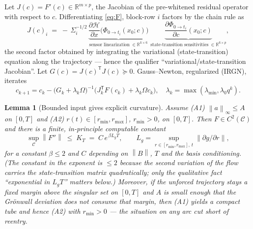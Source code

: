 \documentclass[11pt]{article}
\theoremstyle{plain}
\newtheorem{lemma}[theorem]{Lemma}
\theoremstyle{definition}
\theoremstyle{remark}
\newcommand{\R}{\mathbb{R}}
\newcommand{\norm}[1]{\left\lVert#1\right\rVert}
\newcommand{\trc}{\mathsf{T}}
\begin{document}
Let $J(c)=F'(c)\in\R^{m\times p}$, the Jacobian of the pre-whitened
residual operator with respect to $c$. Differentiating
\eqref{eq:F}, block-row $i$ factors by the chain rule as
\begin{equation}
J(c)_i \;=\; -\,\Sigma_i^{-1/2}\,
\underbrace{\frac{\partial \mathcal H}{\partial x}\big(\Phi_{0\to t_i}(x_0;c)\big)}_{\text{sensor linearization}\;\in\R^{k\times 6}}\;
\underbrace{\frac{\partial \Phi_{0\to t_i}}{\partial c}(x_0;c)}_{\text{state-transition sensitivities}\;\in\R^{6\times p}},
\label{eq:Jfactor}
\end{equation}
the second factor obtained by integrating the variational
(state-transition) equation along the trajectory --- hence the
qualifier ``variational/state-transition Jacobian''. Let
$G(c)=J(c)^{\trc}J(c)\succeq0$. Gauss--Newton, regularized
(IRGN), iterates
\begin{equation}
c_{k+1}=c_k-\big(G_k+\lambda_k\Omega\big)^{-1}
\big(J_k^{\trc}F(c_k)+\lambda_k\Omega c_k\big),\quad
\lambda_k=\max(\lambda_{\min},\lambda_0 q^{k}).
\label{eq:irgn}
\end{equation}

\begin{lemma}[Bounded input gives explicit curvature]\label{lem:KT}
Assume \textup{(A1)} $\norm{a}_\infty\le A$ on $[0,T]$ and \textup{(A2)}
$r(t)\in[r_{\min},r_{\max}]$, $r_{\min}>0$, on $[0,T]$. Then $F\in
C^{2}(\mathcal C)$ and there is a finite, in-principle computable constant
\begin{equation}
\sup_{\mathcal C}\norm{F''}\;\le\;K_T\;=\;C\,e^{\,\beta L_gT},\qquad
L_g=\sup_{r\in[r_{\min},r_{\max}],\,t}\norm{\partial g/\partial r},
\label{eq:KT}
\end{equation}
for a constant $\beta\le2$ and $C$ depending on $\norm B$, $T$ and the
basis conditioning. (The constant in the exponent is $\le2$ because the
\emph{second} variation of the flow carries the state-transition matrix
quadratically; only the qualitative fact ``exponential in $L_gT$''
matters below.) Moreover, if the unforced trajectory stays a fixed
margin above the singular set on $[0,T]$ and $A$ is small enough that the
Gr\"onwall deviation does not consume that margin, then \textup{(A1)}
yields a compact tube and hence \textup{(A2)} with $r_{\min}>0$ --- the
situation on any arc cut short of reentry.
\end{lemma}
\end{document}
